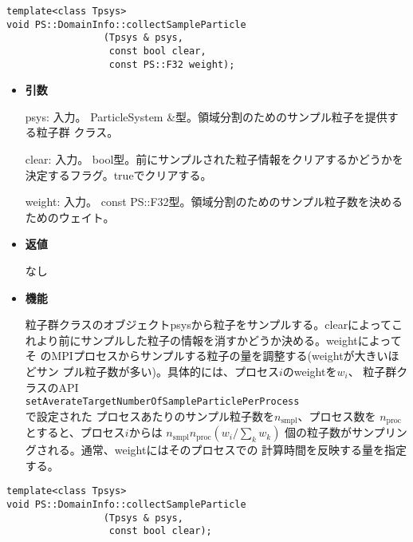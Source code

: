 
\begin{screen}
\begin{verbatim}
template<class Tpsys>
void PS::DomainInfo::collectSampleParticle
                 (Tpsys & psys,
                  const bool clear,
                  const PS::F32 weight);
\end{verbatim}
\end{screen}

\begin{itemize}

\item {\bf 引数}

psys: 入力。 ParticleSystem \&型。領域分割のためのサンプル粒子を提供する粒子群
クラス。

clear: 入力。 bool型。前にサンプルされた粒子情報をクリアするかどうかを
決定するフラグ。trueでクリアする。

weight: 入力。 const PS::F32型。領域分割のためのサンプル粒子数を決める
ためのウェイト。

\item {\bf 返値}

なし

\item {\bf 機能}

粒子群クラスのオブジェクトpsysから粒子をサンプルする。clearによってこ
れより前にサンプルした粒子の情報を消すかどうか決める。weightによってそ
のMPIプロセスからサンプルする粒子の量を調整する(weightが大きいほどサン
プル粒子数が多い)。具体的には、プロセス$i$のweightを$w_{i}$、
粒子群クラスのAPI \\
\texttt{setAverateTargetNumberOfSampleParticlePerProcess}\\
で設定された
プロセスあたりのサンプル粒子数を$n_{\mathrm{smpl}}$、プロセス数を
$n_{\mathrm{proc}}$とすると、プロセス$i$からは
$n_{\mathrm{smpl}}n_{\mathrm{proc}}(w_{i}/\sum_{k}w_{k})$
個の粒子数がサンプリングされる。通常、weightにはそのプロセスでの
計算時間を反映する量を指定する。

\end{itemize}

\begin{screen}
\begin{verbatim}
template<class Tpsys>
void PS::DomainInfo::collectSampleParticle
                 (Tpsys & psys,
                  const bool clear);
\end{verbatim}
\end{screen}

